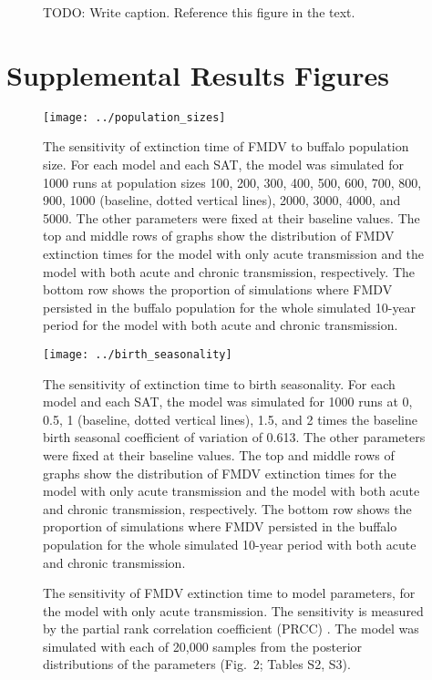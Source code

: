 \documentclass[12pt]{article}
\begin{document}
\begin{figure}
  \centering
  \caption{TODO: Write caption. Reference this figure in the text.}
  \label{fig:stable_age_distribution}
\end{figure}


\printbibliography


\clearpage
\section*{Supplemental Results Figures}

\begin{figure}
  \centering
  \texttt{[image: ../population\_sizes]}
  \caption{The sensitivity of extinction time of FMDV to buffalo
    population size.
    For each model and each SAT, the model was simulated for 1000 runs
    at population sizes 100, 200, 300, 400, 500, 600, 700, 800, 900,
    1000 (baseline, dotted vertical lines), 2000, 3000, 4000, and
    5000.
    The other parameters were fixed at their baseline values.
    The top and middle rows of graphs show the distribution of
    FMDV extinction times for the model with only acute transmission
    and the model with both acute and chronic transmission,
    respectively.
    The bottom row shows the proportion of simulations where FMDV
    persisted in the buffalo population for the whole simulated
    10-year period for the model with both acute and chronic
    transmission.}
\end{figure}

\begin{figure}
  \centering
  \texttt{[image: ../birth\_seasonality]}
  \caption{The sensitivity of extinction time to birth seasonality.
    For each model and each SAT, the model was simulated for
    1000 runs at 0, 0.5, 1 (baseline, dotted vertical lines), 1.5, and
    2 times the baseline birth seasonal coefficient of variation of
    0.613.
    The other parameters were fixed at their baseline values.
    The top and middle rows of graphs show the distribution of
    FMDV extinction times for the model with only acute transmission
    and the model with both acute and chronic transmission,
    respectively.
    The bottom row shows the proportion of simulations where FMDV
    persisted in the buffalo population for the whole simulated
    10-year period with both acute and chronic transmission.}
\end{figure}

\begin{figure}
  \centering
  
  \caption{The sensitivity of FMDV extinction time to model
    parameters, for the model with only acute transmission.
    The sensitivity is measured by the partial rank correlation
    coefficient (PRCC) \autocite{blower_1994}.
    The model was simulated with each of 20,000 samples from the
    posterior distributions of the parameters
    (Fig.~2; Tables S2, S3).}
\end{figure}
\end{document}

